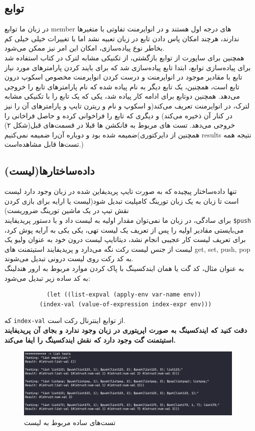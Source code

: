 \documentclass{article}
\begin{document}
\subsection{توابع}
در زبان ما توابع
member 
های درجه اول هستند و در انوایرمنت تفاوتی با متغیر‌ها ندارند،
هرچند امکان پاس دادن تابع در زبان تعبیه نشد اما با تغییرات خیلی خیلی کم بخاطر نوع پیاده‌سازی، 
امکان این امر نیز ممکن می‌شود.
\\
همچنین برای ساپورت از توابع بازگشتی، از تکنیکی مشابه لترک در کتاب استفاده شد\\
برای پیاده‌سازی توابع، ابتدا تابع 
پیاده‌سازی شد که برای بایند کردن پارامتر‌های مورد نیاز تابع با مقادیر موجود در انوایرمنت و درست کردن انوایرمنت مخصوص اسکوپ درون تابع است، 
همچنین، یک تابع دیگر به نام 
پیاده شده که نام پارامتر‌های تابع را خروجی می‌دهد.
همچنین دوتابع برای ادامه کار پیاده شد، یکی 
که یک تابع را با تکنیکی مشابه لترک، در انوایرمنت تعریف می‌کند(و اسکوپ و نام و ریترن تایپ و پارامتر‌های آن را نیز در کنار آن ذخیره می‌کند)
و دیگری 
که تابع را فراخوانی کرده و حاصل فراخانی را خروجی می‌دهد.
تست های مربوط به فانکشن ها قبلا در قسمت‌های قبل(شکل ۲)
ضمیمه شده بود و دوباره آن‌را ضمیمه نمی‌کنیم(همچنین از دایرکتوری results نتیجه همه تست‌ها قابل مشاهده‌است.)
\subsection{داده‌ساختار‌ها(لیست)}
تنها داده‌ساختار پیچیده که به صورت تایپ پریدیفاین شده در زبان 
وجود دارد لیست است تا زبان به یک زبان تورینگ کامپلیت تبدیل شود(لیست یا ارایه برای بازی کردن نقش تیپ در یک ماشین تورینگ ضروریست)
\\
برای سادگی، در زبان ما نمی‌توان مقدار اولیه به لیست داد و با دستور پریدیفایند 
\texttt{\$push}
می‌بایستی مقادیر اولیه را پس از تعریف یک لیست تهی، یکی یکی به آرایه پوش کرد، برای تعریف لیست کار عجیبی انجام نشد، دیتاتایپ لیست درون خود به عنوان ولیو 
یک لیست از جنس لیست رکت نگه می‌دارد و پریدیفایند استیتمنت های 
get, set, push, pop
به کد رکت روی لیست درونی تبدیل می‌شوند.
\\
به عنوان مثال، کد گت یا همان ایندکسینگ با پاک کردن موارد مربوط به ارور هندلینگ به کد ساده زیر تبدیل می‌شود:
\begin{verbatim}
            (let ((list-expval (apply-env var-name env))
          (index-val (value-of-expression index-expr env)))
\end{verbatim}
که 
\texttt{index-val}
از توابع اینترنال رکت است.
\\
\textbf{دقت کنید که ایندکسینگ به صورت اپریتوری در زبان وجود ندارد و بجای آن پریدیفایند استیتمنت گت وجود دارد که نقش ایندکسینگ را ایفا می‌کند.}
        \begin{figure}[h]
        \centering
        \includegraphics[width=0.5\linewidth]{pics/list.png}
        \caption{تست‌های ساده مربوط به لیست}
\end{figure}
\FloatBarrier
\end{document}

